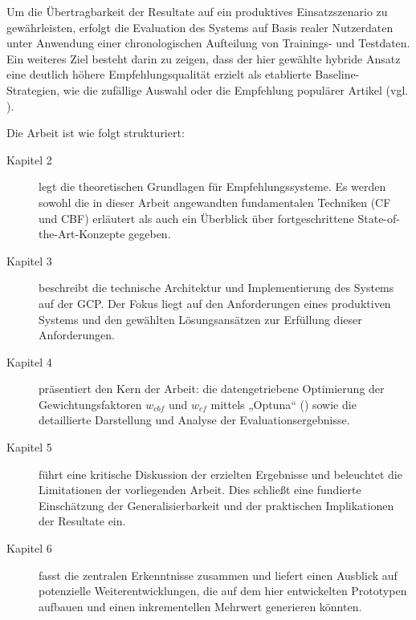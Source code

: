 Um die Übertragbarkeit der Resultate auf ein produktives Einsatzszenario zu gewährleisten, 
erfolgt die Evaluation des Systems auf Basis realer Nutzerdaten unter Anwendung einer 
chronologischen Aufteilung von Trainings- und Testdaten. Ein weiteres Ziel besteht darin zu zeigen, dass der hier gewählte 
hybride Ansatz eine deutlich höhere Empfehlungsqualität 
erzielt als etablierte Baseline-Strategien, wie die zufällige 
Auswahl oder die Empfehlung populärer Artikel (vgl. \cite{wu_personalized_2022}).

Die Arbeit ist wie folgt strukturiert:
\begin{description}
    \item[Kapitel 2] legt die theoretischen Grundlagen für Empfehlungssysteme. Es werden sowohl die in dieser Arbeit angewandten fundamentalen Techniken (CF und CBF) erläutert als auch ein Überblick über fortgeschrittene State-of-the-Art-Konzepte gegeben.
    \item[Kapitel 3] beschreibt die technische Architektur und Implementierung des Systems auf der \ac{GCP}. Der Fokus liegt auf den Anforderungen eines produktiven Systems und den gewählten Lösungsansätzen zur Erfüllung dieser Anforderungen.
    \item[Kapitel 4] präsentiert den Kern der Arbeit: die datengetriebene Optimierung der Gewichtungsfaktoren \(w_{cbf}\) und \(w_{cf}\) mittels „Optuna“ (\cite{Akiba_Optuna_2019}) sowie die detaillierte Darstellung und Analyse der Evaluationsergebnisse.
    \item[Kapitel 5] führt eine kritische Diskussion der erzielten Ergebnisse und beleuchtet die Limitationen der vorliegenden Arbeit. Dies schließt eine fundierte Einschätzung der Generalisierbarkeit und der praktischen Implikationen der Resultate ein.
    \item[Kapitel 6] fasst die zentralen Erkenntnisse zusammen und liefert einen Ausblick auf potenzielle Weiterentwicklungen, die auf dem hier entwickelten Prototypen aufbauen und einen inkrementellen Mehrwert generieren könnten.
\end{description}